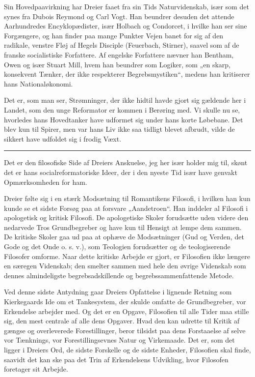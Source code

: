 \documentclass[12pt,a4paper,openany]{book}
\newcommand{\opage}[1]{\marginnote{\footnotesize\textit{[#1]}}}
\begin{document}
Sin Hovedpaavirkning har Dreier faaet fra sin Tids Naturvidenskab, især som det
synes fra Dubois Reymond og Carl Vogt. Han beundrer desuden det attende
Aarhundredes Encyklopædister, især Holbach og Condorcet, i hvilke han ser sine
Forgængere, og han finder paa mange Punkter Vejen banet for sig af den
radikale, venstre Fløj af Hegels Disciple (Feuerbach, Stirner), saavel som af
de franske socialistiske Forfattere. Af engelske Forfattere nævner han Bentham,
Owen og især Stuart Mill, hvem han beundrer som Logiker, som „en skarp,
konsekvent Tænker, der ikke respekterer Begrebsmystiken“, medens han kritiserer
hans Nationaløkonomi.

Det er, som man ser, Strømninger, der ikke hidtil havde gjort sig gældende her
i Landet, som den unge Reformator er kommen i Berøring med. Vi skulle nu se,
hvorledes hans Hovedtanker have udformet sig under hans korte Løbebane. Det
blev kun til Spirer, men var hans Liv ikke saa tidligt blevet afbrudt, vilde de
sikkert have udfoldet sig i frodig Væxt.

\begin{center}\rule{2cm}{0.4pt}\end{center}

Det er den filosofiske Side af Dreiers Anskuelse, jeg her især holder mig til,
skønt det er hans socialreformatoriske Ideer, der i den nyeste Tid især have
genvakt Opmærksomheden for ham.

\setcounter{footnote}{0}%
\opage{178}Dreier følte sig i en stærk Modsætning til Romantikens Filosofi, i
hvilken han kun kunde se et sidste Forsøg paa at forsvare „Aandetroen“. Han
inddeler al Filosofi i apologetisk og kritisk Filosofi. De apologetiske Skoler
forudsætte uden videre den nedarvede Tros Grundbegreber og have kun til Hensigt
at lempe dem sammen. De kritiske Skoler gaa ud paa at ophæve de Modsætninger
(Gud og Verden, det Gode og det Onde o. s. v.), som Teologien forudsætter og de
teologiserende Filosofer omforme. Naar dette kritiske Arbejde er gjort, er
Filosofien ikke længere en særegen Videnskab; den smelter sammen med hele den
øvrige Videnskab som dennes almindeligste begrebsadskillende og
begrebssammenfattende Metode.

Ved denne sidste Antydning gaar Dreiers Opfattelse i lignende Retning som
Kierkegaards Ide om et Tankesystem, der skulde omfatte de Grundbegreber, vor
Erkendelse arbejder med. Og det er en Opgave, Filosofien til alle Tider maa
stille sig, den mest centrale af alle dens Opgaver. Hvad den kan udrette til
Kritik af gængse og overleverede Forestillinger, beror tilsidst paa dens
Forstaaelse af selve vor Tænknings, vor Forestillingsevnes Natur og Virkemaade.
Det er, som det ligger i Dreiers Ord, de sidste Forskelle og de sidste Enheder,
Filosofien skal finde, saavidt det kan ske paa det Trin af Erkendelsens
Udvikling, hvor Filosofen foretager sit Arbejde.
\end{document}
